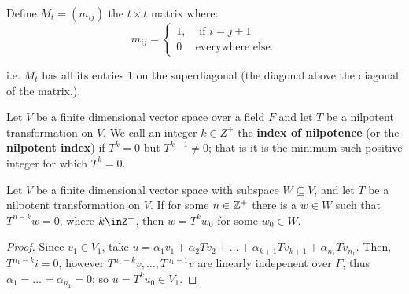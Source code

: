 Define $M_t=(m_{ij})$ the $t \times t$ matrix where:
\begin{equation*}
    m_{ij}=\begin{cases}
            1,  &   \text{ if } i=j+1 \\
            0   &   \text{everywhere else.}
          \end{cases}
\end{equation*}

i.e. $M_t$ has all its entries  $1$ on the superdiagonal  (the diagonal above
the diagonal of the matrix.).

\begin{definition}
    Let $V$ be a finite dimensional vector space over a field  $F$ and let  $T$
    be a nilpotent transformation on  $V$. We call an integer  $k \in Z^+$ the
    \textbf{index of nilpotence} (or the \textbf{nilpotent index}) if $T^k=0$
    but  $T^{k-1} \neq 0$; that is it is the minimum such positive integer for
    which $T^k=0$.
\end{definition}

\begin{lemma}\label{3.4.10}
    Let $V$ be a finite dimensional vector space with subspace  $W \subseteq
    V$, and let  $T$ be a nilpotent transformation on  $V$. If for some $n \in
    \mathbb{Z}^+$ there is a $w \in W$ such that  $T^{n-k}w=0$, where $k \inZ^+$, then
     $w=T^kw_0$ for some $w_0 \in W$.
\end{lemma}
\begin{proof}
    Since $v_1 \in V_1$, take
    $u=\alpha_1v_1+\alpha_2Tv_2+\dots+\alpha_{k+1}Tv_{k+1}+\alpha_{n_1}Tv_{n_1}$.
    Then, $T^{n_1-k}i=0$, however $T^{n_1-k}v, \dots, T^{n_1-1}v$ are linearly
    indepenent over $F$, thus  $\alpha_1=\dots=\alpha_{n_1}=0$; so $u=T^ku_0
    \in V_1$.
\end{proof}

